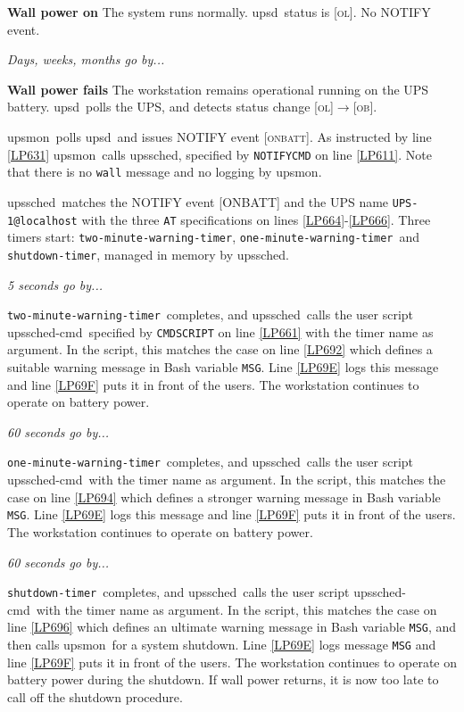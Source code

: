 \documentclass[12pt]{article}
\newcommand{\upsd}{\mbox{\textcolor{UPSDCOLOUR}{upsd}}}
\newcommand{\upsmon}{\mbox{\textcolor{MONCOLOUR}{upsmon}}}
\newcommand{\upssched}{\mbox{\textcolor{SCHEDCOLOUR}{upssched}}}
\newcommand{\upsschedcmd}{\mbox{\textcolor{CMDCOLOUR}{upssched-cmd}}}
\newcommand{\OB}{\textcolor{UPSDCOLOUR}{\textsc{ob}}}
\newcommand{\OL}{\textcolor{UPSDCOLOUR}{\textsc{ol}}}
\newcommand{\ONBATT}{\textcolor{MONCOLOUR}{\textsc{onbatt}}}
\newcommand{\status}[1]{\textcolor{UPSDCOLOUR}{[{#1}]}}
\newcommand{\statuschange}[2]{\status{#1}{\allowbreak}\textcolor{UPSDCOLOUR}{$\rightarrow$}{\allowbreak}\status{#2}}
\newcommand{\NOTev}[1]{\textcolor{MONCOLOUR}{[{#1}]}}
\newcommand{\twominwarntim}{\texttt{two-minute{\allowbreak}-warning{\allowbreak}-timer}}
\newcommand{\oneminwarntim}{\texttt{one-minute{\allowbreak}-warning{\allowbreak}-timer}}
\newcommand{\shutdowntimer}{\texttt{shutdown{\allowbreak}-timer}}
\newcommand{\li}{\item}                 %
\newcommand{\Ref}[1]{\ref{#1}}
\begin{document}
\li\label{workOL} \textbf{Wall power on} \quad The system runs
normally. \upsd\ status is \status{\OL}. No NOTIFY event.

\textsl{Days, weeks, months go by...}

\li \textbf{Wall power fails} \quad The workstation remains operational
running on the UPS battery.  \upsd\ polls the UPS, and detects status change
\statuschange{\OL}{\OB}.

\li \upsmon\ polls \upsd\ and issues NOTIFY event \NOTev{\ONBATT}.  As
instructed by line \Ref{LP631} \upsmon\ calls \upssched, specified by
\texttt{NOTIFYCMD} on line \ref{LP611}.  Note that there is no \texttt{wall}
message and no logging by \upsmon.

\li \upssched\ matches the NOTIFY event \NOTev{ONBATT} and the UPS name
\verb`UPS-1@localhost` with the three \texttt{AT} specifications on lines
\ref{LP664}-\ref{LP666}.  Three timers start: \twominwarntim,
\oneminwarntim\ and \shutdowntimer, managed in memory by \upssched.

\textsl{5 seconds go by...}

\li \twominwarntim\ completes, and \upssched\ calls the user script
\upsschedcmd\ specified by \texttt{CMDSCRIPT} on line \ref{LP661} with the
timer name as argument.  In the script, this matches the case on line
\ref{LP692} which defines a suitable warning message in Bash variable
\texttt{MSG}.  Line \ref{LP69E} logs this message and line \ref{LP69F} puts it
in front of the users.  The workstation continues to operate on battery power.

\textsl{60 seconds go by...}

\li \oneminwarntim\ completes, and \upssched\ calls the user script
\upsschedcmd\ with the timer name as argument.  In the script, this matches the
case on line \ref{LP694} which defines a stronger warning message in Bash
variable \texttt{MSG}.  Line \ref{LP69E} logs this message and line
\ref{LP69F} puts it in front of the users.  The workstation continues to
operate on battery power.

\textsl{60 seconds go by...}

\li \shutdowntimer\ completes, and \upssched\ calls the user script
\upsschedcmd\ with the timer name as argument.  In the script, this matches
the case on line \ref{LP696} which defines an ultimate warning message in Bash
variable \texttt{MSG}, and then calls \upsmon\ for a system shutdown.  Line
\ref{LP69E} logs message \texttt{MSG} and line \ref{LP69F} puts it in front of
the users.  The workstation continues to operate on battery power during the
shutdown.  If wall power returns, it is now too late to call off the shutdown
procedure.
\end{document}
